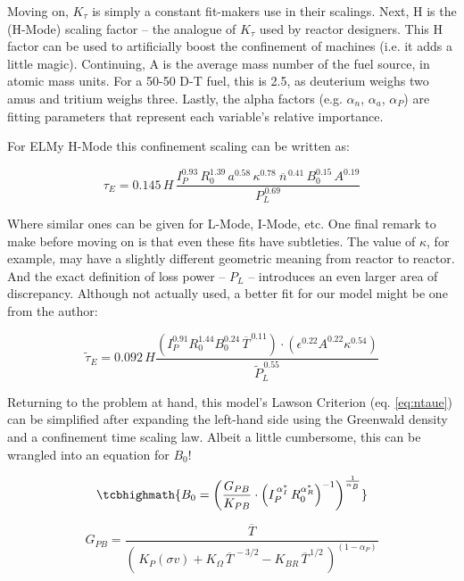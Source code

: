 Moving on, $K_\tau$ is simply a constant fit-makers use in their scalings. Next, H is the (H-Mode) scaling factor -- the analogue of $K_\tau$ used by reactor designers. This H factor can be used to artificially boost the confinement of machines (i.e. it adds a little magic). Continuing, A is the average mass number of the fuel source, in atomic mass units. For a 50-50 D-T fuel, this is 2.5, as deuterium weighs two amus and tritium weighs three. Lastly, the alpha factors (e.g. $\alpha_n$, $\alpha_a$, $\alpha_P$) are fitting parameters that represent each variable's relative importance. 

For ELMy H-Mode this confinement scaling can be written as:

\begin{equation}
	\tau_E = 0.145 \, H \, \frac{
		I_P^{0.93} \, R_0^{1.39} \, a^{0.58} \, \kappa^{0.78} \ \overline{n}^{\, 0.41} \, B_0^{0.15} \, A^{0.19}
	}{ P_L ^ {\,0.69} }
\end{equation}

Where similar ones can be given for L-Mode, I-Mode, etc. One final remark to make before moving on is that even these fits have subtleties. The value of $\kappa$, for example, may have a slightly different geometric meaning from reactor to reactor. And the exact definition of loss power -- $P_L$ -- introduces an even larger area of discrepancy.  Although not actually used, a better fit for our model might be one from the author:

\begin{equation}
	\tilde \tau_E = 0.092 \, H \frac{  
		\left( I_P^{0.91} R_0^{1.44} B_0 ^ {0.24} \,\overline T ^ {\,0.11} \right) \cdot \left( \epsilon ^ {0.22} A^{0.22}  \kappa ^ {0.54} \right) }{ \tilde P_L ^ {\, 0.55} }	
\end{equation}

Returning to the problem at hand, this model's Lawson Criterion (eq. \ref{eq:ntaue}) can be simplified after expanding the left-hand side using the Greenwald density and a confinement time scaling law. Albeit a little cumbersome, this can be wrangled into an equation for $B_0$!

\begin{equation}
	\label{eq:b_0_power}
	\tcbhighmath{
	B_0 = \left( \frac{ G_{PB} }{ K_{PB} } \cdot \left( I_P^{\,\alpha_I^*} \, R_0^{ \alpha_R^* } \right)^{-1} \right) ^ { \frac{1}{ \alpha_B } }
	}
\end{equation}

\begin{equation}
	G_{PB} = \frac{ \overline{T} }{ \left( \, K_P (\sigma v) + K_\Omega  \, \overline{T}^{  \,-3/2 } - K_{BR} \, \overline{T}^{  \,1/2 } \, \right) ^ { ( 1 - \alpha_P ) } }
\end{equation}

